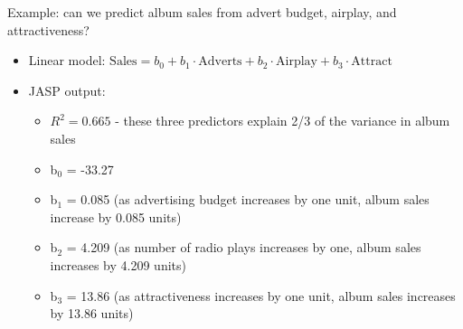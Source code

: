 \documentclass[11pt]{article}
\begin{document}
Example: can we predict album sales from advert budget, airplay, and attractiveness?
\begin{itemize}
\item Linear model: $\text{Sales}=b_0+b_1\cdot \text{Adverts}+b_2\cdot\text{Airplay}+b_3\cdot\text{Attract}$
\item JASP output:
\begin{itemize}
\item $R^2=0.665$ - these three predictors explain 2/3 of the variance in album sales
\item b$_{\text{0}}$ = -33.27
\item b$_{\text{1}}$ = 0.085 (as advertising budget increases by one unit, album sales increase by 0.085 units)
\item b$_{\text{2}}$ = 4.209 (as number of radio plays increases by one, album sales increases by 4.209 units)
\item b$_{\text{3}}$ = 13.86 (as attractiveness increases by one unit, album sales increases by 13.86 units)
\end{itemize}
\end{itemize}
\end{document}
